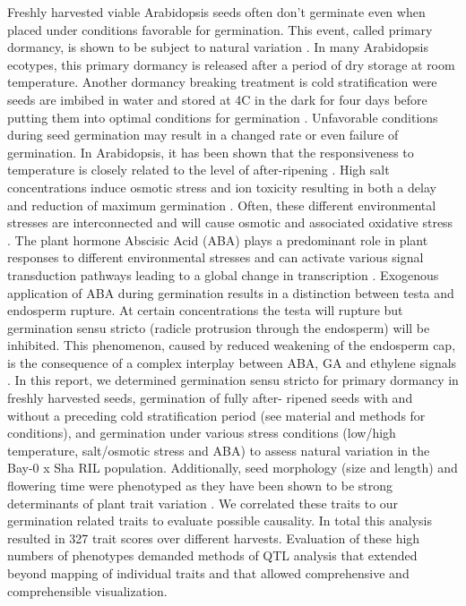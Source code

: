 Freshly harvested viable Arabidopsis seeds often don't germinate even when placed under conditions 
favorable for germination. This event, called primary dormancy, is shown to be subject to natural 
variation \cite{Bentsink:2010}. In many Arabidopsis ecotypes, this primary dormancy is released after 
a period of dry storage at room temperature. Another dormancy breaking treatment is cold stratification 
were seeds are imbibed in water and stored at 4\degree C in the dark for four days before putting them into 
optimal conditions for germination \cite{Finch-Savage:2006}. Unfavorable conditions during seed 
germination may result in a changed rate or even failure of germination. In Arabidopsis, it has been 
shown that the responsiveness to temperature is closely related to the level of after-ripening 
\cite{Tamura:2006}. High salt concentrations induce osmotic stress and ion toxicity resulting in both 
a delay and reduction of maximum germination \cite{Galpaz:2010}. Often, these different environmental 
stresses are interconnected and will cause osmotic and associated oxidative stress \cite{Zhu:2002, 
Chinnusamy:2004}. The plant hormone Abscisic Acid (ABA) plays a predominant role in plant 
responses to different environmental stresses and can activate various signal transduction pathways 
leading to a global change in transcription \cite{Finkelstein:2002, Xiong:2002}. Exogenous application 
of ABA during germination results in a distinction between testa and endosperm rupture. At certain 
concentrations the testa will rupture but germination sensu stricto (radicle protrusion through the 
endosperm) will be inhibited. This phenomenon, caused by reduced weakening of the endosperm cap, is 
the consequence of a complex interplay between ABA, GA and ethylene signals \cite{Linkies:2009}. 
In this report, we determined germination sensu stricto for primary dormancy in freshly harvested seeds, 
germination of fully after- ripened seeds with and without a preceding cold stratification period 
(see material and methods for conditions), and germination under various stress conditions (low/high 
temperature, salt/osmotic stress and ABA) to assess natural  variation in the Bay-0 x Sha RIL population. 
Additionally, seed morphology (size and length) and flowering time were phenotyped as they have been 
shown to be strong determinants of plant trait variation \cite{Elwell:2011, Chiang:2009, Orsi:2009}. 
We correlated these traits to our germination related traits to evaluate 
possible causality. In total this analysis resulted in 327 trait scores over different harvests. 
Evaluation of these high numbers of phenotypes demanded methods of QTL analysis that extended beyond 
mapping of individual traits and that allowed comprehensive and comprehensible visualization.

